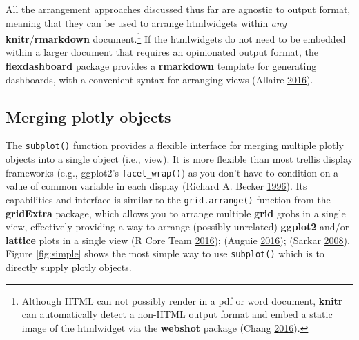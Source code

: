 \documentclass[12pt,]{isuthesis}
\newenvironment{Shaded}{\begin{snugshade}}{\end{snugshade}}
\newcommand{\KeywordTok}[1]{\textcolor[rgb]{0.13,0.29,0.53}{\textbf{{#1}}}}
\newcommand{\DataTypeTok}[1]{\textcolor[rgb]{0.13,0.29,0.53}{{#1}}}
\newcommand{\StringTok}[1]{\textcolor[rgb]{0.31,0.60,0.02}{{#1}}}
\newcommand{\NormalTok}[1]{{#1}}
\let\rmarkdownfootnote\footnote%
\def\footnote{\protect\rmarkdownfootnote}
\begin{document}
All the arrangement approaches discussed thus far are agnostic to output
format, meaning that they can be used to arrange htmlwidgets within
\emph{any} \textbf{knitr}/\textbf{rmarkdown} document.\footnote{Although
  HTML can not possibly render in a pdf or word document, \textbf{knitr}
  can automatically detect a non-HTML output format and embed a static
  image of the htmlwidget via the \textbf{webshot} package (Chang
  \protect\hyperlink{ref-webshot}{2016}).} If the htmlwidgets do not
need to be embedded within a larger document that requires an
opinionated output format, the \textbf{flexdashboard} package provides a
\textbf{rmarkdown} template for generating dashboards, with a convenient
syntax for arranging views (Allaire
\protect\hyperlink{ref-flexdashboard}{2016}).

\subsection{Merging plotly objects}\label{merging-plotly-objects}

The \texttt{subplot()} function provides a flexible interface for
merging multiple plotly objects into a single object (i.e., view). It is
more flexible than most trellis display frameworks (e.g., ggplot2's
\texttt{facet\_wrap()}) as you don't have to condition on a value of
common variable in each display (Richard A. Becker
\protect\hyperlink{ref-trellis}{1996}). Its capabilities and interface
is similar to the \texttt{grid.arrange()} function from the
\textbf{gridExtra} package, which allows you to arrange multiple
\textbf{grid} grobs in a single view, effectively providing a way to
arrange (possibly unrelated) \textbf{ggplot2} and/or \textbf{lattice}
plots in a single view (R Core Team \protect\hyperlink{ref-base}{2016});
(Auguie \protect\hyperlink{ref-gridExtra}{2016}); (Sarkar
\protect\hyperlink{ref-lattice}{2008}). Figure \ref{fig:simple} shows
the most simple way to use \texttt{subplot()} which is to directly
supply plotly objects.

\begin{Shaded}
\end{Shaded}
\end{document}

